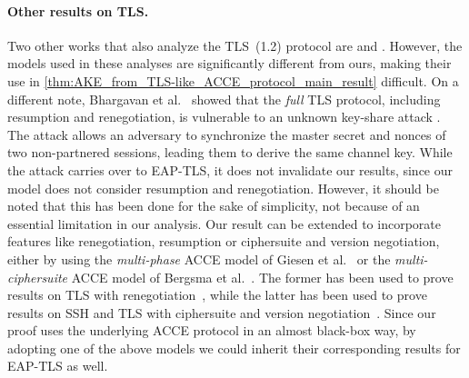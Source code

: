 \paragraph{Other results on TLS.}
Two other works that also analyze the TLS~(1.2) protocol are \cite{INDOCRYPT:KMOTV15} and \cite{C:BFKPSZ14}.
However,
the models used in these analyses are significantly different from ours,
making their use in \cref{thm:AKE_from_TLS-like_ACCE_protocol_main_result} difficult.
On a different note,
Bhargavan et al.~\cite{C:BFKPSZ14} showed that the \emph{full} TLS protocol,
including resumption and renegotiation,
is vulnerable to an unknown key-share attack \cite{PKC:BlaMen99}.
The attack allows an adversary to synchronize the master secret and nonces of two non-partnered sessions,
leading them to derive  the same channel key. 
While the attack carries over to EAP-TLS,
it does not invalidate our results,
since our model does not consider resumption and renegotiation. 
However,
it should be noted that this has been done for the sake of simplicity,
not because of an essential limitation in our analysis.
Our result can be extended to incorporate features like renegotiation, resumption or ciphersuite and version negotiation,
either by using the \emph{multi-phase} ACCE model of Giesen et al.~\cite{CCS:GieKohSte13}
or the \emph{multi-ciphersuite} ACCE model of Bergsma et al.~\cite{CCS:BDKSS14}.
The former has been used to prove results on TLS with renegotiation~\cite{CCS:BDKSS14},
while the latter has been used to prove results on SSH and TLS with ciphersuite and version negotiation~\cite{CCS:BDKSS14,ACISP:DowSte15}.
Since our proof uses the underlying ACCE protocol in an almost black-box way,
by adopting one of the above models we could  inherit their corresponding results for EAP-TLS as well.
%
%
%
